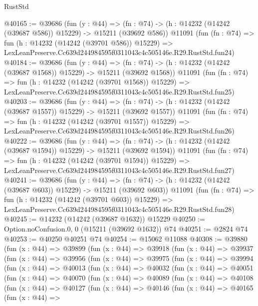 \begin{lexlean}{RustStd}
\begin{coremodule}
@40165 := @39686
    (fun (y : @44) =>
    (fn : @74) -> (h : @14232 (@14242 (@39687 @586)) @15229) -> @15211 (@39692 @586))
    @11091
    (fun (fn : @74) =>
    fun (h : @14232 (@14242 (@39701 @586)) @15229) =>
    LexLeanPreserve.Cc639d244984595f0311043c4c505146e.R29.RustStd.fun24)
@40184 := @39686
    (fun (y : @44) =>
    (fn : @74) -> (h : @14232 (@14242 (@39687 @1568)) @15229) -> @15211 (@39692 @1568))
    @11091
    (fun (fn : @74) =>
    fun (h : @14232 (@14242 (@39701 @1568)) @15229) =>
    LexLeanPreserve.Cc639d244984595f0311043c4c505146e.R29.RustStd.fun25)
@40203 := @39686
    (fun (y : @44) =>
    (fn : @74) -> (h : @14232 (@14242 (@39687 @1557)) @15229) -> @15211 (@39692 @1557))
    @11091
    (fun (fn : @74) =>
    fun (h : @14232 (@14242 (@39701 @1557)) @15229) =>
    LexLeanPreserve.Cc639d244984595f0311043c4c505146e.R29.RustStd.fun26)
@40222 := @39686
    (fun (y : @44) =>
    (fn : @74) -> (h : @14232 (@14242 (@39687 @1594)) @15229) -> @15211 (@39692 @1594))
    @11091
    (fun (fn : @74) =>
    fun (h : @14232 (@14242 (@39701 @1594)) @15229) =>
    LexLeanPreserve.Cc639d244984595f0311043c4c505146e.R29.RustStd.fun27)
@40241 := @39686
    (fun (y : @44) =>
    (fn : @74) -> (h : @14232 (@14242 (@39687 @603)) @15229) -> @15211 (@39692 @603))
    @11091
    (fun (fn : @74) =>
    fun (h : @14232 (@14242 (@39701 @603)) @15229) =>
    LexLeanPreserve.Cc639d244984595f0311043c4c505146e.R29.RustStd.fun28)
@40245 := @14232 (@14242 (@39687 @1632)) @15229
@40250 := Option.noConfusion.{0, 0} (@15211 (@39692 @1632)) @74
@40251 := @2824 @74
@40253 := @40250 @40251 @74
@40254 := @15062 @11088
@40308 := @39880
    (fun (x : @44) =>
    @39899
      (fun (x : @44) =>
      @39918
        (fun (x : @44) =>
        @39937
          (fun (x : @44) =>
          @39956
            (fun (x : @44) =>
            @39975
              (fun (x : @44) =>
              @39994
                (fun (x : @44) =>
                @40013
                  (fun (x : @44) =>
                  @40032
                    (fun (x : @44) =>
                    @40051
                      (fun (x : @44) =>
                      @40070
                        (fun (x : @44) =>
                        @40089
                          (fun (x : @44) =>
                          @40108
                            (fun (x : @44) =>
                            @40127
                              (fun (x : @44) =>
                              @40146
                                (fun (x : @44) =>
                                @40165
                                  (fun (x : @44) =>

\end{coremodule}
\end{lexlean}
